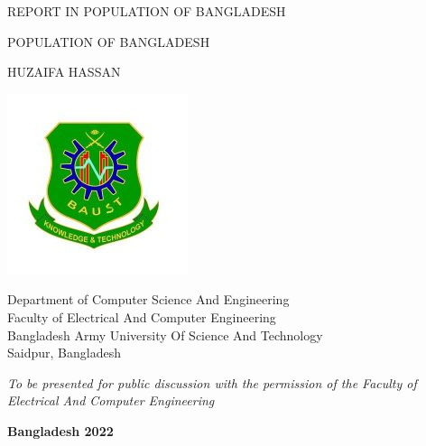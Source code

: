 \documentclass[a4paper,12pt]{article}
\begin{document}
\pagestyle{empty}

\begin{center}
REPORT IN POPULATION OF BANGLADESH \\

\vspace*{3cm}

{\Large POPULATION OF BANGLADESH 
\\
}

\vspace*{2cm}

{\large
HUZAIFA HASSAN \\
}
\vspace*{1cm}
\graphicspath{ {./images/} }
\includegraphics{baust 1}

Department of Computer Science And Engineering \\
Faculty of Electrical And Computer Engineering \\
Bangladesh Army University Of Science And Technology \\
Saidpur, Bangladesh

\vspace*{2cm}

{\em To be presented for public discussion with the permission of the Faculty of Electrical And Computer Engineering
}

\vspace*{1cm}

{\bf Bangladesh 2022}

\newpage
\vspace*{-2.2cm}


\end{center}
\end{document}
